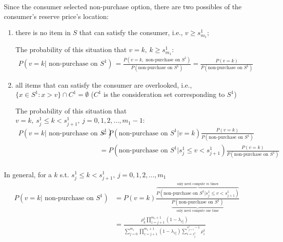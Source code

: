 \documentclass[11pt,a4paper]{article}
\begin{document}
Since the consumer selected non-purchase option, there are two possibles of the consumer's reserve price's location:
\begin{enumerate}[(1)]
    \item there is no item in $S$ that can satisfy the consumer, i.e., $v\geq s_{m_1}^1$;
    
    The probability of this situation that $v=k,\ k\geq s_{m_1}^1$:
    \begin{equation}
        \begin{aligned}
            P(v=k \vert\text{ non-purchase on }S^1)&=\frac{P(v=k,\text{ non-purchase on }S^1)}{P(\text{non-purchase on }S^1)}=\frac{P(v=k)}{P(\text{non-purchase on }S^1)}
        \end{aligned}
        \nonumber
    \end{equation}
    \item all items that can satisfy the consumer are overlooked, i.e., $\{x\in S^1:x>v\}\cap C^1=\emptyset$ ($C^1$ is the consideration set corresponding to $S^1$)
    
    The probability of this situation that $v=k,\ s_{j}^1\leq k< s_{j+1}^1,\ j=0,1,2,...,m_1-1$:
    \begin{equation}
        \begin{aligned}
            P(v=k \vert\text{ non-purchase on }S^1)&=P(\text{non-purchase on }S^1\vert v=k)\frac{P(v=k)}{P(\text{non-purchase on }S^1)}\\
            &=P(\text{non-purchase on }S^1\vert s_{j}^1\leq v< s_{j+1}^1)\frac{P(v=k)}{P(\text{non-purchase on }S^1)}\\
        \end{aligned}
        \nonumber
    \end{equation}
\end{enumerate}

In general, for a $k$ s.t. $s_{j}^1\leq k< s_{j+1}^1,\ j=0,1,2,...,m_1$
\begin{equation}
    \begin{aligned}
        P(v=k \vert\text{ non-purchase on }S^1)
        &=P(v=k)\frac{\overbrace{P(\text{non-purchase on }S^1\vert s_{j}^1\leq v< s_{j+1}^1)}^{\text{only need compute $m$ times}}}{\underbrace{P(\text{non-purchase on }S^1)}_{\text{only need compute one time}}}\\
        &=\frac{\rho_k^1\prod_{z=j+1}^{m_1+1}(1-\lambda_{s_{z}^1})}{\sum_{j=0}^{m_1} \prod_{z=j+1}^{m_1+1}(1-\lambda_{s_{z}^1})\sum_{i=s_j^1}^{s_{j+1}^1-1}\rho_i^1}\\
    \end{aligned}
    \nonumber
\end{equation}
\end{document}
